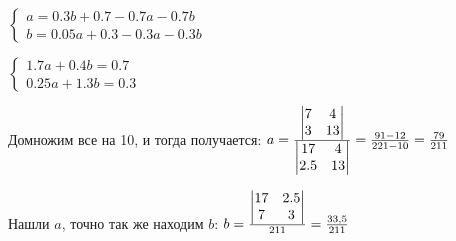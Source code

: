 $\begin{cases}
a  =  0.3b+0.7-0.7a-0.7b \\
b  =  0.05a+0.3-0.3a-0.3b 
\end{cases}
$

$\begin{cases}
1.7a + 0.4b  =  0.7 \\
0.25a + 1.3b  =  0.3 
\end{cases}$




Домножим все на 10, и тогда получается:
$a=\frac{\begin{vmatrix}
	7 & 4\\
	3 & 13
\end{vmatrix}}
{\begin{vmatrix}
	17 & 4\\
	2.5 & 13
\end{vmatrix}}=\frac{91-12}{221-10}=\frac{79}{211}\\ $

Нашли $a$, точно так же находим $b$:
$b=\frac{\begin{vmatrix}
	17 & 2.5\\
	7 & 3
\end{vmatrix}}
{211}=\frac{33,5}{211}\\ $

